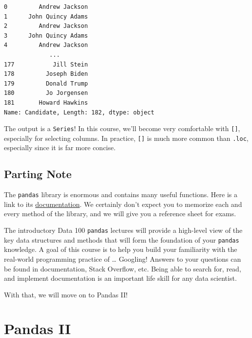 \documentclass[
  letterpaper,
  DIV=11,
  numbers=noendperiod]{scrreprt}
\begin{document}
\begin{verbatim}
0         Andrew Jackson
1      John Quincy Adams
2         Andrew Jackson
3      John Quincy Adams
4         Andrew Jackson
             ...        
177           Jill Stein
178         Joseph Biden
179         Donald Trump
180         Jo Jorgensen
181       Howard Hawkins
Name: Candidate, Length: 182, dtype: object
\end{verbatim}

The output is a \texttt{Series}! In this course, we'll become very
comfortable with \texttt{{[}{]}}, especially for selecting columns. In
practice, \texttt{{[}{]}} is much more common than \texttt{.loc},
especially since it is far more concise.

\section{Parting Note}\label{parting-note}

The \texttt{pandas} library is enormous and contains many useful
functions. Here is a link to its
\href{https://pandas.pydata.org/docs/}{documentation}. We certainly
don't expect you to memorize each and every method of the library, and
we will give you a reference sheet for exams.

The introductory Data 100 \texttt{pandas} lectures will provide a
high-level view of the key data structures and methods that will form
the foundation of your \texttt{pandas} knowledge. A goal of this course
is to help you build your familiarity with the real-world programming
practice of \ldots{} Googling! Answers to your questions can be found in
documentation, Stack Overflow, etc. Being able to search for, read, and
implement documentation is an important life skill for any data
scientist.

With that, we will move on to Pandas II!


\chapter{Pandas II}\label{pandas-ii}
\end{document}
